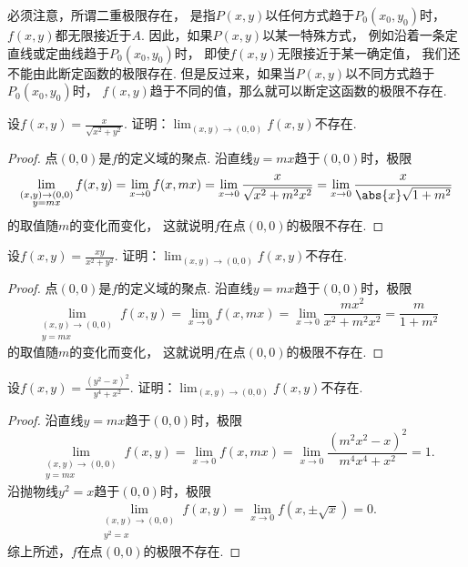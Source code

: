 必须注意，所谓二重极限存在，
是指\(P(x,y)\)以任何方式趋于\(P_0(x_0,y_0)\)时，\(f(x,y)\)都无限接近于\(A\).
因此，如果\(P(x,y)\)以某一特殊方式，
例如沿着一条定直线或定曲线趋于\(P_0(x_0,y_0)\)时，
即使\(f(x,y)\)无限接近于某一确定值，
我们还不能由此断定函数的极限存在.
但是反过来，如果当\(P(x,y)\)以不同方式趋于\(P_0(x_0,y_0)\)时，
\(f(x,y)\)趋于不同的值，那么就可以断定这函数的极限不存在.

\begin{example}
设\(f(x,y) = \frac{x}{\sqrt{x^2+y^2}}\).
证明：\(\lim_{(x,y)\to(0,0)} f(x,y)\)不存在.
\begin{proof}
点\((0,0)\)是\(f\)的定义域的聚点.
沿直线\(y=mx\)趋于\((0,0)\)时，极限\begin{equation*}
	\lim_{\substack{(x,y)\to(0,0) \\ y=mx}} f(x,y)
	= \lim_{x\to0} f(x,mx)
	= \lim_{x\to0} \frac{x}{\sqrt{x^2+m^2x^2}}
	= \lim_{x\to0} \frac{x}{\abs{x} \sqrt{1+m^2}}
\end{equation*}的取值随\(m\)的变化而变化，
这就说明\(f\)在点\((0,0)\)的极限不存在.
\end{proof}
\end{example}
\begin{example}
设\(f(x,y) = \frac{xy}{x^2+y^2}\).
证明：\(\lim_{(x,y)\to(0,0)} f(x,y)\)不存在.
\begin{proof}
点\((0,0)\)是\(f\)的定义域的聚点.
沿直线\(y=mx\)趋于\((0,0)\)时，极限\begin{equation*}
	\lim_{\substack{(x,y)\to(0,0) \\ y=mx}} f(x,y)
	= \lim_{x\to0} f(x,mx)
	= \lim_{x\to0} \frac{mx^2}{x^2+m^2x^2}
	= \frac{m}{1+m^2}
\end{equation*}的取值随\(m\)的变化而变化，
这就说明\(f\)在点\((0,0)\)的极限不存在.
\end{proof}
\end{example}
\begin{example}
设\(f(x,y) = \frac{(y^2-x)^2}{y^4+x^2}\).
证明：\(\lim_{(x,y)\to(0,0)} f(x,y)\)不存在.
\begin{proof}
沿直线\(y=mx\)趋于\((0,0)\)时，极限\begin{equation*}
	\lim_{\substack{(x,y)\to(0,0) \\ y=mx}} f(x,y)
	= \lim_{x\to0} f(x,mx)
	= \lim_{x\to0} \frac{(m^2x^2-x)^2}{m^4x^4+x^2}
	= 1.
\end{equation*}
沿抛物线\(y^2=x\)趋于\((0,0)\)时，极限\begin{equation*}
	\lim_{\substack{(x,y)\to(0,0) \\ y^2=x}} f(x,y)
	= \lim_{x\to0} f(x,\pm\sqrt{x})
	= 0.
\end{equation*}
综上所述，\(f\)在点\((0,0)\)的极限不存在.
\end{proof}
\end{example}
